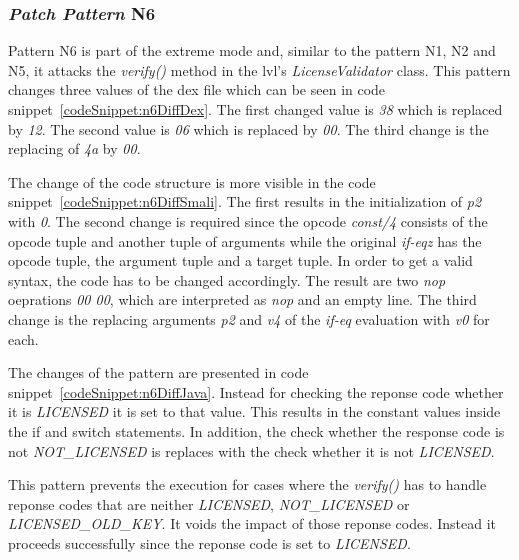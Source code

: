 \subsubsection{\textit{Patch Pattern} N6}
Pattern N6 is part of the extreme mode and, similar to the pattern N1, N2 and N5, it attacks the \textit{verify()} method in the \gls{lvl}'s \textit{LicenseValidator} class.
\newline
This pattern changes three values of the \gls{dex} file which can be seen in code snippet~\ref{codeSnippet:n6DiffDex}.
The first changed value is \textit{38} which is replaced by \textit{12}.
The second value is \textit{06} which is replaced by \textit{00}.
The third change is the replacing of \textit{4a} by \textit{00}.
\newline

The change of the code structure is more visible in the code snippet~\ref{codeSnippet:n6DiffSmali}.
The first results in the initialization of \textit{p2} with \textit{0}.
The second change is required since the opcode \textit{const/4} consists of the  opcode tuple and another tuple of arguments while the original \textit{if-eqz} has the opcode tuple, the argument tuple and a target tuple.
In order to get a valid syntax, the code has to be changed accordingly.
The result are two \textit{nop} oeprations \textit{00 00}, which are interpreted as \textit{nop} and an empty line.
The third change is the replacing arguments \textit{p2} and \textit{v4} of the \textit{if-eq} evaluation with \textit{v0} for each.
\newline

The changes of the pattern are presented in code snippet~\ref{codeSnippet:n6DiffJava}.
Instead for checking the reponse code whether it is \textit{LICENSED} it is set to that value.
This results in the constant values inside the if and switch statements.
In addition, the check whether the response code is not \textit{NOT\_LICENSED} is replaces with the check whether it is not \textit{LICENSED}.
\newline

This pattern prevents the execution for cases where the \textit{verify()} has to handle reponse codes that are neither \textit{LICENSED}, \textit{NOT\_LICENSED} or \textit{LICENSED\_OLD\_KEY}.
It voids the impact of those reponse codes.
Instead it proceeds successfully since the reponse code is set to \textit{LICENSED}.

